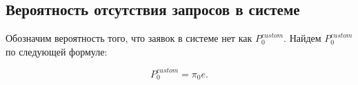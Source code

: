 \documentclass[12pt, a4paper]{article}
\begin{document}
\begin{figure}[h]
\end{figure}

\pagebreak

\subsection{Вероятность отсутствия запросов в системе}


Обозначим вероятность того, что заявок в системе нет как $P_0^{custom}$. Найдем $P_0^{custom}$ по следующей формуле:

$$P_0^{custom} = \pi_0 e.$$
\end{document}
